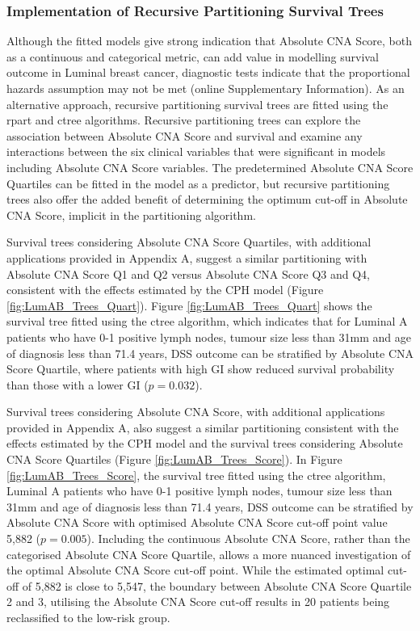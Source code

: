 \subsubsection{Implementation of Recursive Partitioning Survival Trees}
Although the fitted models give strong indication that Absolute CNA Score, both as a continuous and categorical metric, can add value in modelling survival outcome in Luminal breast cancer, diagnostic tests indicate that the proportional hazards assumption may not be met (online Supplementary Information). As an alternative approach, recursive partitioning survival trees are fitted using the rpart and ctree algorithms. Recursive partitioning trees can explore the association between Absolute CNA Score and survival and examine any interactions between the six clinical variables that were significant in models including Absolute CNA Score variables. The predetermined Absolute CNA Score Quartiles can be fitted in the model as a predictor, but recursive partitioning trees also offer the added benefit of determining the optimum cut-off in Absolute CNA Score, implicit in the partitioning algorithm. 

Survival trees considering Absolute CNA Score Quartiles, with additional applications provided in Appendix A, suggest a similar partitioning with Absolute CNA Score Q1 and Q2 versus Absolute CNA Score Q3 and Q4, consistent with the effects estimated by the CPH model (Figure \ref{fig:LumAB_Trees_Quart}). Figure \ref{fig:LumAB_Trees_Quart} shows the survival tree fitted using the ctree algorithm, which indicates that for Luminal A patients who have 0-1 positive lymph nodes, tumour size less than 31mm and age of diagnosis less than 71.4 years, DSS outcome can be stratified by Absolute CNA Score Quartile, where patients with high GI show reduced survival probability than those with a lower GI ($p = 0.032$).   

Survival trees considering Absolute CNA Score, with additional applications provided in Appendix A, also suggest a similar partitioning consistent with the effects estimated by the CPH model and the survival trees considering Absolute CNA Score Quartiles (Figure \ref{fig:LumAB_Trees_Score}). In Figure \ref{fig:LumAB_Trees_Score}, the survival tree fitted using the ctree algorithm, Luminal A patients who have 0-1 positive lymph nodes, tumour size less than 31mm and age of diagnosis less than 71.4 years, DSS outcome can be stratified by Absolute CNA Score with optimised Absolute CNA Score cut-off point value 5,882 ($p = 0.005$). Including the continuous Absolute CNA Score, rather than the categorised Absolute CNA Score Quartile, allows a more nuanced investigation of the optimal Absolute CNA Score cut-off point. While the estimated optimal cut-off of 5,882 is close to 5,547, the boundary between Absolute CNA Score Quartile 2 and 3, utilising the Absolute CNA Score cut-off results in 20 patients being reclassified to the low-risk group.  

